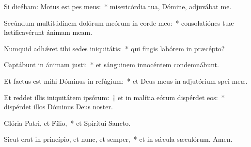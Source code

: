 \item Si dicébam: Motus est pes meus:~* misericórdia tua, Dómine, adjuvábat me.

\item Secúndum multitúdinem dolórum meórum in corde meo:~* consolatiónes tuæ lætificavérunt ánimam meam.

\item Numquid adhǽret tibi sedes iniquitátis:~* qui fingis labórem in præcépto?

\item Captábunt in ánimam justi:~* et sánguinem innocéntem condemnábunt.

\item Et factus est mihi Dóminus in refúgium:~* et Deus meus in adjutórium spei meæ.

\item Et reddet illis iniquitátem ipsórum:~† et in malítia eórum dispérdet eos:~* dispérdet illos Dóminus Deus noster.

\item Glória Patri, et Fílio,~* et Spirítui Sancto.

\item Sicut erat in princípio, et nunc, et semper,~* et in sǽcula sæculórum. Amen.

